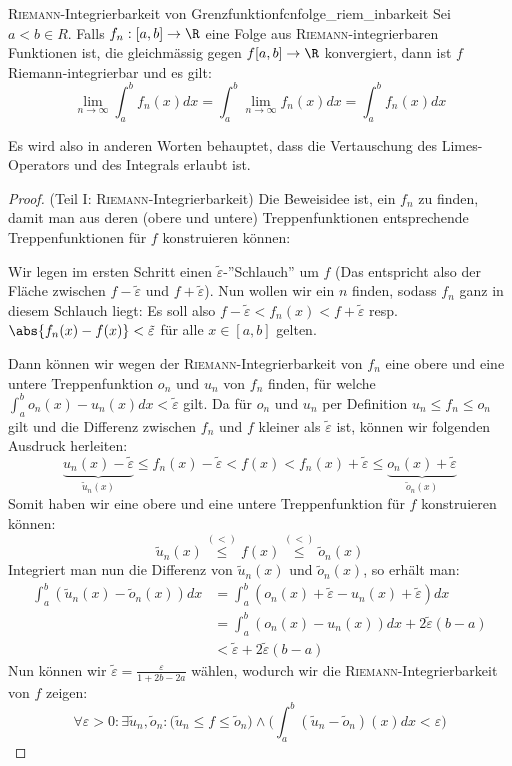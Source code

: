 \begin{satz}{\textsc{Riemann}-Integrierbarkeit von Grenzfunktion}{fcnfolge_riem_inbarkeit}
Sei $a < b \in R$. Falls $f_n:[a,b] \to \R$ eine Folge aus \textsc{Riemann}-integrierbaren Funktionen ist, die gleichmässig gegen $f[a,b] \to \R$ konvergiert, dann ist $f$ Riemann-integrierbar und es gilt:
$$\lim_{n \to \infty} \int_a^b{f_n(x)}dx =  \int_a^b \lim_{n \to \infty}{f_n(x)}dx = \int_a^b {f_n(x)}dx$$
\end{satz}
Es wird also in anderen Worten behauptet, dass die Vertauschung des Limes-Operators und des Integrals erlaubt ist.

\begin{proof} (Teil I: \textsc{Riemann}-Integrierbarkeit) Die Beweisidee ist, ein $f_n$ zu finden, damit man aus deren (obere und untere) Treppenfunktionen entsprechende Treppenfunktionen für $f$ konstruieren können:

Wir legen im ersten Schritt einen $\tilde{\varepsilon}$-''Schlauch'' um $f$ (Das entspricht also der Fläche zwischen $f-\tilde{\varepsilon}$ und $f+\tilde{\varepsilon}$). Nun wollen wir ein $n$ finden, sodass $f_n$ ganz in diesem Schlauch liegt: Es soll also $f-\tilde{\varepsilon} < f_n(x) < f+\tilde{\varepsilon}$ resp. $\abs{f_n(x) - f(x)} < \tilde{\varepsilon}$ für alle $x \in [a,b]$ gelten.

Dann können wir wegen der \textsc{Riemann}-Integrierbarkeit von $f_n$ eine obere und eine untere Treppenfunktion $o_n$ und $u_n$ von $f_n$ finden, für welche $\int_a^b o_n(x) - u_n(x) dx < \tilde{\varepsilon}$ gilt. Da für $o_n$ und $u_n$ per Definition $u_n \leq f_n \leq o_n$ gilt und die Differenz zwischen $f_n$ und $f$ kleiner als $\tilde{\varepsilon}$ ist, können wir folgenden Ausdruck herleiten:
$$\underbrace{u_n(x) - \tilde{\varepsilon}}_{\tilde{u}_n(x)} \leq f_n(x) - \tilde{\varepsilon} < f(x) < f_n(x) + \tilde{\varepsilon} \leq \underbrace{o_n(x) + \tilde{\varepsilon}}_{\tilde{o}_n(x)}$$
Somit haben wir eine obere und eine untere Treppenfunktion für $f$ konstruieren können:
$$\tilde{u}_n(x) \stackrel{(<)}{\leq} f(x) \stackrel{(<)}{\leq} \tilde{o}_n(x)$$
Integriert man nun die Differenz von $\tilde{u}_n(x)$ und $\tilde{o}_n(x)$, so erhält man:
\begin{align*}
    \int_a^b(\tilde{u}_n(x)-\tilde{o}_n(x))dx &= \int_a^b(o_n(x) + \tilde{\varepsilon} - u_n(x) + \tilde{\varepsilon})dx\\
    &=\int_a^b(o_n(x) - u_n(x))dx + 2\tilde{\varepsilon}(b-a)\\
    &<\tilde{\varepsilon}+ 2\tilde{\varepsilon}(b-a)
\end{align*}
Nun können wir $\tilde{\varepsilon} = \frac{\varepsilon}{1+2b-2a}$ wählen, wodurch wir die \textsc{Riemann}-Integrierbarkeit von $f$ zeigen:
$$\forall \varepsilon > 0: \exists \tilde{u}_n, \tilde{o}_n: \Big(\tilde{u}_n \leq f \leq \tilde{o}_n\Big) \land \Big(\int_a^b(\tilde{u}_n - \tilde{o}_n)(x)dx < \varepsilon\Big)$$


\end{proof}
